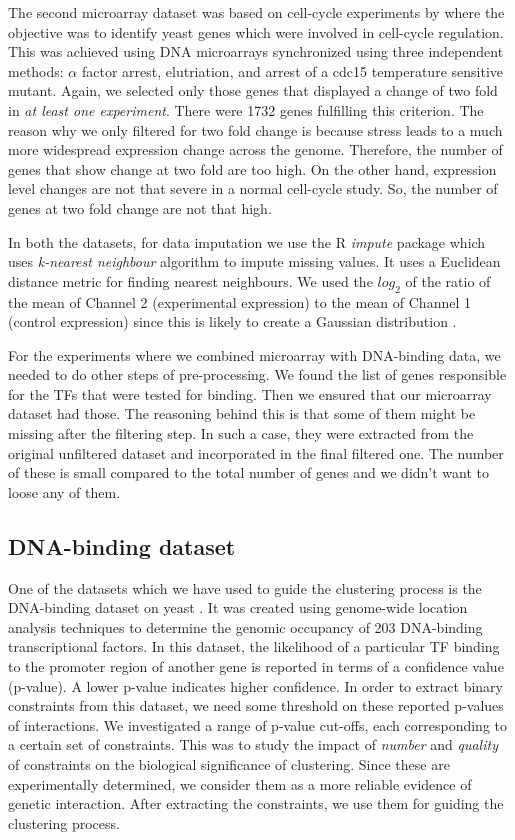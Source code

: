 The second microarray dataset was based on cell-cycle experiments by \citet{spellman98comprehensive} where the objective was to identify yeast genes which were involved in cell-cycle regulation. This was achieved using DNA microarrays synchronized using three independent methods: $\alpha$ factor arrest, elutriation, and arrest of a cdc15 temperature sensitive mutant. Again, we selected only those genes that displayed a change of two fold in \textit{at least one experiment}. There were 1732 genes fulfilling this criterion. The reason why we only filtered for two fold change is because stress leads to a much more widespread expression change across the genome. Therefore, the number of genes that show change at two fold are too high. On the other hand, expression level changes are not that severe in a normal cell-cycle study. So, the number of genes at two fold change are not that high.

In both the datasets, for data imputation we use the R \textit{impute} package which uses \textit{k-nearest neighbour} algorithm to impute missing values. It uses a Euclidean distance metric for finding nearest neighbours. We used the $log_{2}$ of the ratio of the mean of Channel 2 (experimental expression) to the mean of Channel 1 (control expression) since this is likely to create a Gaussian distribution \citep{ernstwit2004statis_microarrays}.

For the experiments where we combined microarray with DNA-binding data, we needed to do other steps of pre-processing. We found the list of genes responsible for the TFs that were tested for binding. Then we ensured that our microarray dataset had those. The reasoning behind this is that some of them might be missing after the filtering step. In such a case, they were extracted from the original unfiltered dataset and incorporated in the final filtered one. The number of these is small compared to the total number of genes and we didn't want to loose any of them.

\subsection{DNA-binding dataset}
One of the datasets which we have used to guide the clustering process is the DNA-binding dataset on yeast \citep{harbison04transcriptional}. It was created using genome-wide location analysis techniques to determine the genomic occupancy of 203 DNA-binding transcriptional factors. In this dataset, the likelihood of a particular TF binding to the promoter region of another gene is reported in terms of a confidence value (p-value). A lower p-value indicates higher confidence. In order to extract binary constraints from this dataset, we need some threshold on these reported p-values of interactions. We investigated a range of p-value cut-offs, each corresponding to a certain set of constraints. This was to study the impact of \textit{number} and \textit{quality} of constraints on the biological significance of clustering. Since these are experimentally determined, we consider them as a more reliable evidence of genetic interaction. After extracting the constraints, we use them for guiding the clustering process. 

